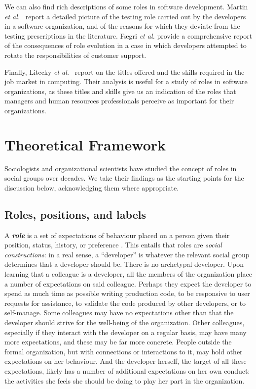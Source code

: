 \documentclass[10pt, conference, compsocconf]{IEEEtran}
\begin{document}
We can also find rich descriptions of some roles in software development. Martin \emph{et al.}\ \cite{Martin2007} report a detailed picture of the testing role carried out by the developers in a software organization, and of the reasons for which they deviate from the testing prescriptions in the literature. F{\ae}gri \emph{et al.} \cite{Faegri2010} provide a comprehensive report of the consequences of role evolution in a case in which developers attempted to rotate the responsibilities of customer support.

Finally, Litecky \emph{et al.}\ \cite{Litecky2010} report on the titles offered and the skills required in the job market in computing. Their analysis is useful for a study of roles in software organizations, as these titles and skills give us an indication of the roles that managers and human resources professionals perceive as important for their organizations.




\section{Theoretical Framework}

Sociologists and organizational scientists have studied the concept of roles in social groups over decades. We take their findings as the starting points for the discussion below, acknowledging them where appropriate.

\subsection{Roles, positions, and labels}

A \textbf{\emph{role}} is a set of expectations of behaviour placed on a person given their position, status, history, or preference \cite{Turner1956,Gordon1976,Rizzo1970}. This entails that roles are \emph{social constructions}: in a real sense, a ``developer'' is whatever the relevant social group determines that a developer should be. There is no archetypal developer. Upon learning that a colleague is a developer, all the members of the organization place a number of expectations on said colleague. Perhaps they expect the developer to spend as much time as possible writing production code, to be responsive to user requests for assistance, to validate the code produced by other developers, or to self-manage. Some colleagues may have no expectations other than that the developer should strive for the well-being of the organization. Other colleagues, especially if they interact with the developer on a regular basis, may have many more expectations, and these may be far more concrete. People outside the formal organization, but with connections or interactions to it, may hold other expectations on her behaviour. And the developer herself, the target of all these expectations, likely has a number of additional expectations on her own conduct: the activities she feels she should be doing to play her part in the organization.
\end{document}
